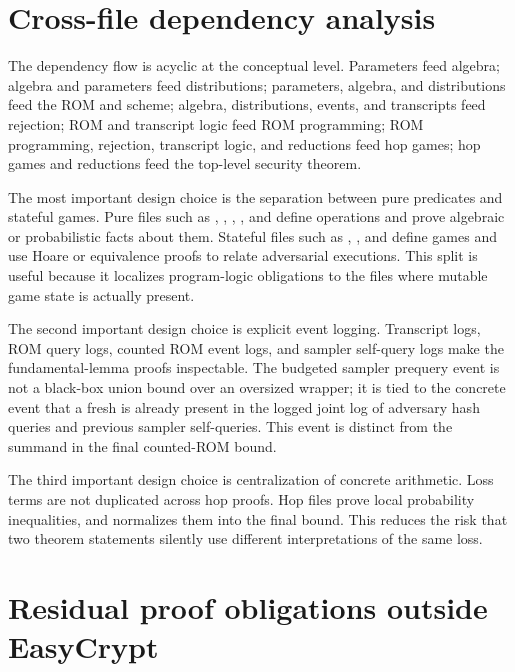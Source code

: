 \section{Cross-file dependency analysis}
\label{app:ec-cross-file-analysis}

The dependency flow is acyclic at the conceptual level.  Parameters feed
algebra; algebra and parameters feed distributions; parameters, algebra, and
distributions feed the ROM and scheme; algebra, distributions, events, and
transcripts feed rejection; ROM and transcript logic feed ROM programming; ROM
programming, rejection, transcript logic, and reductions feed hop games; hop
games and reductions feed the top-level security theorem.

The most important design choice is the separation between pure predicates and
stateful games.  Pure files such as ,
, ,
, and  define
operations and prove algebraic or probabilistic facts about them.  Stateful files
such as , , and
 define games and use Hoare or equivalence proofs to
relate adversarial executions.  This split is useful because it localizes
program-logic obligations to the files where mutable game state is actually
present.

The second important design choice is explicit event logging.  Transcript logs,
ROM query logs, counted ROM event logs, and sampler self-query logs make the
fundamental-lemma proofs inspectable.  The budgeted sampler prequery event is not
a black-box union bound over an oversized wrapper; it is tied to the concrete
event that a fresh  is already present in the
logged joint log of adversary hash queries and previous sampler self-queries.
This event is distinct from the  summand in
the final counted-ROM bound.

The third important design choice is centralization of concrete arithmetic.
Loss terms are not duplicated across hop proofs.  Hop files prove local
probability inequalities, and  normalizes them into
the final bound.  This reduces the risk that two theorem statements silently use
different interpretations of the same loss.

\section{Residual proof obligations outside EasyCrypt}
\label{app:ec-residual-obligations}

